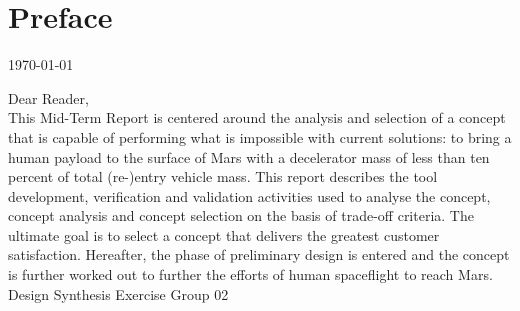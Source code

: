 \section*{Preface}\label{cha:preface}

\begin{flushright}
	\today
\end{flushright}

Dear Reader,	
\\ [1cm]
This Mid-Term Report is centered around the analysis and selection of a concept that is capable of performing what is impossible with current solutions: to bring a human payload to the surface of Mars with a decelerator mass of less than ten percent of total (re-)entry vehicle mass. This report describes the tool development, verification and validation activities used to analyse the concept, concept analysis and concept selection on the basis of trade-off criteria. The ultimate goal is to select a concept that delivers the greatest customer satisfaction. Hereafter, the phase of preliminary design is entered and the concept is further worked out to further the efforts of human spaceflight to reach Mars.
\\ [1.5cm]
Design Synthesis Exercise Group 02